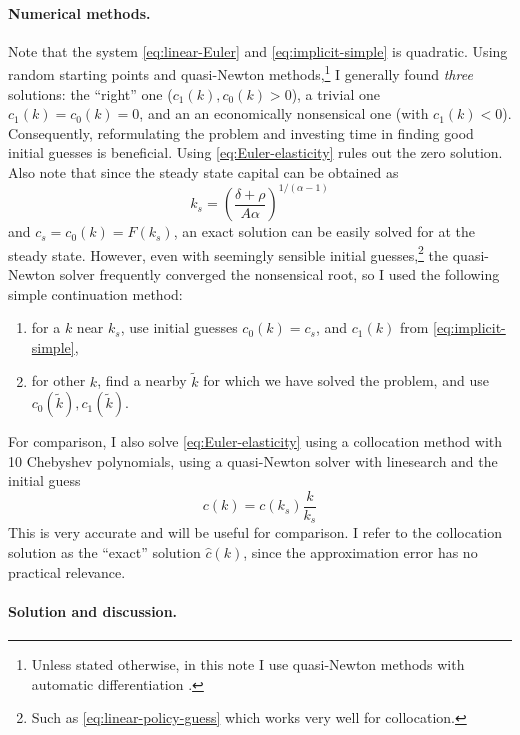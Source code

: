 \documentclass[a4paper,11pt]{article}
\newcommand{\tk}{\tilde{k}}
\newcommand{\hc}{\hat{c}}
\begin{document}
\paragraph{Numerical methods.}

Note that the system \eqref{eq:linear-Euler} and \eqref{eq:implicit-simple} is quadratic. Using random starting points and quasi-Newton methods,\footnote{Unless stated otherwise, in this note I use quasi-Newton methods with automatic differentiation \parencite{RevelsLubinPapamarkou2016}.} I generally found  \emph{three} solutions: the ``right'' one ($c_1(k), c_0(k) > 0$), a trivial one $c_1(k) = c_0(k) = 0$, and an an economically nonsensical one (with $c_1(k) < 0$). Consequently, reformulating the problem and investing time in finding good initial guesses is beneficial. Using \eqref{eq:Euler-elasticity} rules out the zero solution. Also note that since the steady state capital can be obtained as
\begin{equation}
  k_s = \left(\frac{\delta+\rho}{A\alpha}\right)^{1/(\alpha-1)}
\end{equation}
and $c_s=c_0(k) = F(k_s)$, an exact solution can be easily solved for at the steady state. However, even with seemingly sensible initial guesses,\footnote{Such as \eqref{eq:linear-policy-guess} which works very well for collocation.} the quasi-Newton solver frequently converged the nonsensical root, so I used the following simple continuation method:
\begin{enumerate}
\item for a $k$ near $k_s$, use initial guesses $c_0(k)=c_s$, and $c_1(k)$ from \eqref{eq:implicit-simple},
\item for other $k$, find a nearby $\tk$ for which we have solved the problem, and use $c_0(\tk), c_1(\tk)$.
\end{enumerate}

For comparison, I also solve \eqref{eq:Euler-elasticity} using a collocation method with 10 Chebyshev polynomials, using a quasi-Newton solver with linesearch and the initial guess
\begin{equation}
  \label{eq:linear-policy-guess}
  c(k) = c(k_s) \frac{k}{k_s}
\end{equation}
This is very accurate and will be useful for comparison. I refer to the collocation solution as the ``exact'' solution $\hc(k)$, since the approximation error has no practical relevance.

\paragraph{Solution and discussion.}
\end{document}

